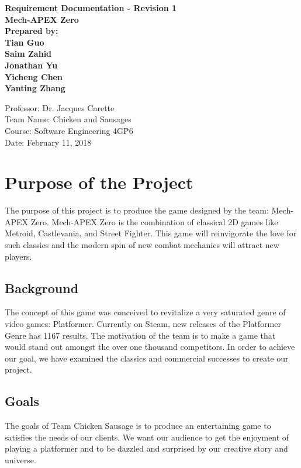 \documentclass{article}
\begin{document}
	\begin{center}
        \vspace*{1cm}
        \textbf{\Large Requirement Documentation - Revision 1}
        \vspace{0.5cm}
        \textbf{\Large  \\Mech-APEX Zero}
        \vspace{1cm}
        \textbf{\\Prepared by: \\ Tian Guo\\Saim Zahid\\Jonathan Yu\\ Yicheng Chen \\Yanting Zhang }
        \vfill
        \vspace{0.8cm}
        \begin{flushright}
        Professor: Dr. Jacques Carette\\
        Team Name: Chicken and Sausages\\
        Course: Software Engineering 4GP6\\
        Date: February 11, 2018
        \end{flushright}
    \end{center}
	\newpage
	\tableofcontents

	\section{Purpose of the Project}
	The purpose of this project is to produce the game designed by the team: Mech-APEX Zero. Mech-APEX Zero is the combination of classical 2D games like Metroid, Castlevania, and Street Fighter. This game will reinvigorate the love for such classics and the modern spin of new combat mechanics will attract new players.

	\subsection{Background}
	The concept of this game was conceived to revitalize a very saturated genre of video games: Platformer. Currently on Steam, new releases of the Platformer Genre has 1167 results. The motivation of the team is to make a game that would stand out amongst the over one thousand competitors. In order to achieve our goal, we have examined the classics and commercial successes to create our project.

	\subsection{Goals}
	The goals of Team Chicken Sausage is to produce an entertaining game to satisfies the needs of our clients. We want our audience to get the enjoyment of playing a platformer and to be dazzled and surprised by our creative story and universe.
\end{document}
